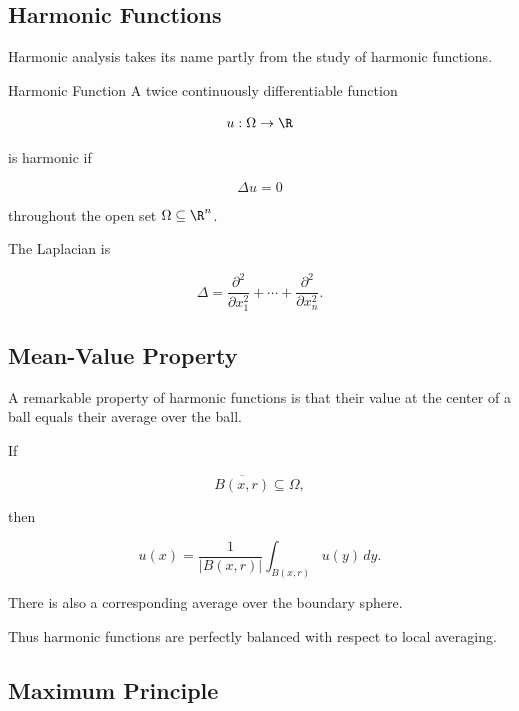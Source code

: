 \subsection{Harmonic Functions}
\label{subsec:harmonic-functions}

Harmonic analysis takes its name partly from the study of harmonic
functions.

\begin{definitionbox}{Harmonic Function}
A twice continuously differentiable function

\[
u:\Omega\to\R
\]

is harmonic if

\[
\boxed{
\Delta u=0
}
\]

throughout the open set \(\Omega\subseteq\R^n\).
\end{definitionbox}

The Laplacian is

\[
\boxed{
\Delta
=
\frac{\partial^2}{\partial x_1^2}
+\cdots+
\frac{\partial^2}{\partial x_n^2}.
}
\]

\subsection{Mean-Value Property}
\label{subsec:harmonic-mean-value}

A remarkable property of harmonic functions is that their value at the
center of a ball equals their average over the ball.

If

\[
\overline{B(x,r)}
\subseteq\Omega,
\]

then

\[
\boxed{
u(x)
=
\frac{1}{|B(x,r)|}
\int_{B(x,r)}u(y)\,dy.
}
\]

There is also a corresponding average over the boundary sphere.

Thus harmonic functions are perfectly balanced with respect to local
averaging.

\subsection{Maximum Principle}
\label{subsec:harmonic-maximum-principle}

